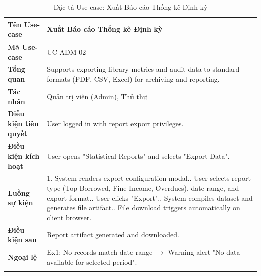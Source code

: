 \newpage
\begin{longtable}{|p{3.5cm}|p{11.5cm}|}
    \hline
    \textbf{Tên Use-case} & \textbf{Xuất Báo cáo Thống kê Định kỳ} \\
    \hline
    \textbf{Mã Use-case} & UC-ADM-02 \\
    \hline
    \textbf{Tổng quan} & Supports exporting library metrics and audit data to standard formats (PDF, CSV, Excel) for archiving and reporting. \\
    \hline
    \textbf{Tác nhân} & Quản trị viên (Admin), Thủ thư \\
    \hline
    \textbf{Điều kiện tiên quyết} & User logged in with report export privileges. \\
    \hline
    \textbf{Điều kiện kích hoạt} & User opens "Statistical Reports" and selects "Export Data". \\
    \hline
    \textbf{Luồng sự kiện} & 
    1. System renders export configuration modal.\newline
    2. User selects report type (Top Borrowed, Fine Income, Overdues), date range, and export format.\newline
    3. User clicks "Export".\newline
    4. System compiles dataset and generates file artifact.\newline
    5. File download triggers automatically on client browser. \\
    \hline
    \textbf{Điều kiện sau} & Report artifact generated and downloaded. \\
    \hline
    \textbf{Ngoại lệ} & 
    Ex1: No records match date range $\rightarrow$ Warning alert "No data available for selected period". \\
    \hline
    \caption{Đặc tả Use-case: Xuất Báo cáo Thống kê Định kỳ}
\end{longtable}

